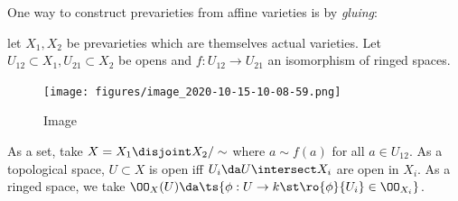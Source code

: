 One way to construct prevarieties from affine varieties is by
\emph{gluing}:

\begin{definition}

let \(X_1, X_2\) be prevarieties which are themselves actual varieties.
Let \(U_{12} \subset X_1, U_{21} \subset X_2\) be opens and
\(f: U_{12} \to U_{21}\) an isomorphism of ringed spaces.

\begin{figure}
\centering
\texttt{[image: figures/image\_2020-10-15-10-08-59.png]}
\caption{Image}
\end{figure}

As a set, take \(X = X_1 \disjoint X_2/\sim\) where \(a\sim f(a)\) for
all \(a\in U_{12}\). As a topological space, \(U \subset X\) is open iff
\(U_i \da U\intersect X_i\) are open in \(X_i\). As a ringed space, we
take
\(\OO_X(U) \da \ts{\phi: U\to k \st \ro{\phi}{U_i} \in \OO_{X_i}}\).

\end{definition}

